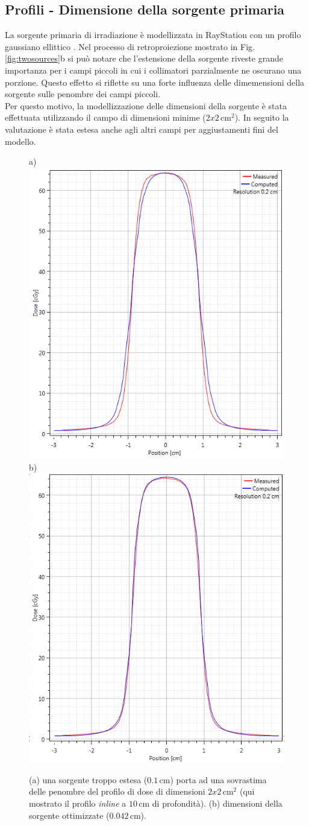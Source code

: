 \subsection{Profili - Dimensione della sorgente primaria}
La sorgente primaria di irradiazione è modellizzata in RayStation con un profilo gaussiano ellittico \cite{Chaney1994}. Nel processo di retroproiezione mostrato in Fig.\ref{fig:twosources}b si può notare che l'estensione della sorgente riveste grande importanza per i campi piccoli in cui i collimatori parzialmente ne oscurano una porzione. Questo effetto si riflette su una forte influenza delle dimemensioni della sorgente sulle penombre dei campi piccoli.\\
Per questo motivo, la modellizzazione delle dimensioni della sorgente è stata effettuata utilizzando il campo di dimensioni minime ($2x2\,$cm$^2$). In seguito la valutazione è stata estesa anche agli altri campi per aggiustamenti fini del modello.
\begin{figure}
\centering
a)\includegraphics[width=.43\textwidth]{./cap2/Ray_penumbra_wrong.PNG}
b)\includegraphics[width=.43\textwidth]{./cap2/Ray_penumbra_right.PNG}
\caption{(a) una sorgente troppo estesa ($0.1\,$cm) porta ad una sovrastima delle penombre del profilo di dose di dimensioni $2x2\,$cm$^2$ (qui mostrato il profilo \textit{inline} a $10\,$cm di profondità). (b) dimensioni della sorgente ottimizzate ($0.042\,$cm).}
\label{fig:source_2x2}
\end{figure}


